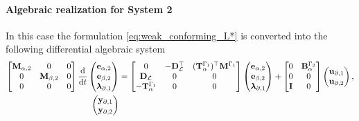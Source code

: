\documentclass[11pt,a4paper]{article}
\begin{document}
{\paragraph{Algebraic realization for System 2}
In this case the formulation \eqref{eq:weak_conforming_L*} is converted into the following differential algebraic system
\begin{equation}
\begin{aligned}
        \begin{bmatrix}
            \mathbf{M}_{\alpha, 2} & 0 & 0\\
            0 & \mathbf{M}_{\beta, 2}  & 0 \\
            0 & 0 & 0
        \end{bmatrix} 
        \odv{}{t}
        \begin{pmatrix}
            \mathbf{e}_{\alpha, 2} \\
            \mathbf{e}_{\beta, 2} \\
            \bm{\lambda}_{\partial, 1}
        \end{pmatrix} &=
        \begin{bmatrix}
            0 & -\mathbf{D}_\mathcal{L}^\top & (\mathbf{T}_{\alpha}^{\Gamma_1})^\top \mathbf{M}^{\Gamma_1} \\
            \mathbf{D}_\mathcal{L} & 0 & 0 \\
            -\mathbf{T}_{\alpha}^{\Gamma_1} & 0 & 0
        \end{bmatrix}
        \begin{pmatrix}
            \mathbf{e}_{\alpha, 2} \\
            \mathbf{e}_{\beta, 2} \\
            \bm{\lambda}_{\partial, 1}
        \end{pmatrix} + 
        \begin{bmatrix}
            0 & \mathbf{B}_\alpha^{\Gamma_2} \\
            0 & 0  \\
            \mathbf{I}& 0
        \end{bmatrix}
        \begin{pmatrix}
            \mathbf{u}_{\partial, 1} \\
            \mathbf{u}_{\partial, 2}
        \end{pmatrix}, \\
        \begin{pmatrix}
            \mathbf{y}_{\partial, 1} \\
            \mathbf{y}_{\partial, 2}

\end{pmatrix}
\end{aligned}
\end{equation}}
\end{document}
